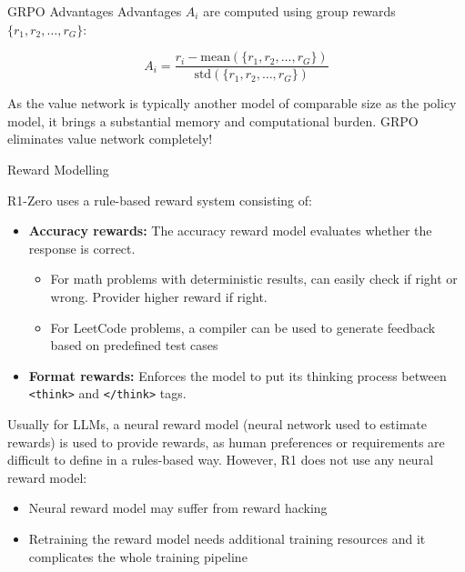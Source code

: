 \documentclass[8pt]{beamer}
\begin{document}
\begin{frame}{GRPO Advantages}
Advantages $A_i$ are computed using group rewards $\{r_1,r_2,\ldots,r_G\}$:

\begin{equation*}
A_i = \frac{r_i - \text{mean}(\{r_1,r_2,\ldots,r_G\})}{\text{std}(\{r_1,r_2,\ldots,r_G\})} \tag{3}
\end{equation*}

\vspace{1em}

As the value network is typically another model of comparable size as
the policy model, it brings a substantial memory and computational burden. GRPO eliminates value network completely! 
\end{frame}

\begin{frame}{Reward Modelling}

R1-Zero uses a rule-based reward system consisting of:

\begin{itemize}\setlength{\itemsep}{8pt}
\item \textbf{Accuracy rewards:} The accuracy reward model evaluates whether the response is correct.
    \begin{itemize}\setlength{\itemsep}{3pt}
        \item For math problems with deterministic results, can easily check if right or wrong. Provider higher reward if right.
        \item For LeetCode problems, a compiler can be used to generate feedback based on predefined test cases
    \end{itemize}

\item \textbf{Format rewards:} Enforces the model to put its thinking process between \texttt{<think>} and \texttt{</think>} tags.
\end{itemize}

\vspace{1em}
Usually for LLMs, a neural reward model (neural network used to estimate rewards) is used to provide rewards, as human preferences or requirements are difficult to define in a rules-based way. However, R1 does not use any neural reward model:
\begin{itemize}
    \item Neural reward model may suffer from reward hacking
    \item Retraining the reward model needs additional training resources and it complicates the whole training pipeline
\end{itemize}

\end{frame}
\end{document}
